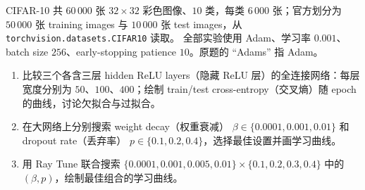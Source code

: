 CIFAR-10 共 $60\,000$ 张 $32\times32$ 彩色图像、$10$ 类，每类 $6\,000$ 张；官方划分为 $50\,000$ 张 training images 与 $10\,000$ 张 test images，从 \texttt{torchvision.datasets.CIFAR10} 读取。
全部实验使用 Adam、学习率 $0.001$、batch size $256$、early-stopping patience $10$。原题的 ``Adams'' 指 Adam。

\begin{enumerate}[label=(\alph*)]
  \item 比较三个各含三层 hidden ReLU layers（隐藏 ReLU 层）的全连接网络：每层宽度分别为 $50$、$100$、$400$；绘制 train/test cross-entropy（交叉熵）随 epoch 的曲线，讨论欠拟合与过拟合。
  \item 在大网络上分别搜索 weight decay（权重衰减）
    $\beta\in\{0.0001,0.001,0.01\}$ 和 dropout rate（丢弃率）
    $p\in\{0.1,0.2,0.4\}$，选择最佳设置并画学习曲线。
  \item 用 Ray Tune 联合搜索
    $\{0.0001,0.001,0.005,0.01\}\times\{0.1,0.2,0.3,0.4\}$
    中的 $(\beta,p)$，绘制最佳组合的学习曲线。
\end{enumerate}

